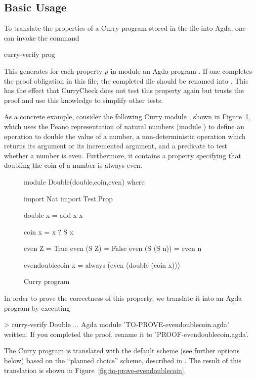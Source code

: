 \subsection{Basic Usage}

To translate the properties of a Curry program stored
in the file  into Agda,
one can invoke the command
%
\begin{curry}
curry-verify prog
\end{curry}
%
This generates for each property $p$ in module 
an Agda program .
If one completes the proof obligation in this file,
the completed file should be renamed into
.
This has the effect that CurryCheck does not test this property again
but trusts the proof and use this knowledge to simplify other tests.

As a concrete example, consider the following Curry module ,
shown in Figure~\ref{fig:double-curry},
which uses the Peano representation of natural numbers
(module ) to define an operation to double the value
of a number, a non-deterministic operation 
which returns its argument or its incremented argument,
and a predicate to test whether a number is even.
Furthermore, it contains a property specifying that
doubling the coin of a number is always even.

\begin{figure}[t]
\begin{curry}

module Double(double,coin,even) where

import Nat
import Test.Prop

double x = add x x

coin x = x ? S x

even Z         = True
even (S Z)     = False
even (S (S n)) = even n

evendoublecoin x = always (even (double (coin x)))

\end{curry}
\caption{Curry program \label{fig:double-curry}}
\end{figure}

In order to prove the correctness of this property,
we translate it into an Agda program by executing
%
\begin{curry}
> curry-verify Double
$\ldots$
Agda module 'TO-PROVE-evendoublecoin.agda' written.
If you completed the proof, rename it to 'PROOF-evendoublecoin.agda'.
\end{curry}
%
The Curry program is translated with
the default scheme (see further options below) based on
the ``planned choice'' scheme, described in \cite{AntoyHanusLibby17EPTCS}.
The result of this translation is shown in
Figure~\ref{fig:to-prove-evendoublecoin}.

